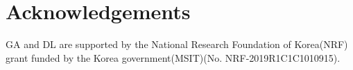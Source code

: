 \documentclass[reqno,10pt]{amsart}
\numberwithin{equation}{section}
\begin{document}
\section{Acknowledgements}%
GA and DL are supported by the National Research Foundation of Korea(NRF) grant funded by the Korea government(MSIT)(No. NRF-2019R1C1C1010915). 


\nocite{*}

\end{document}
